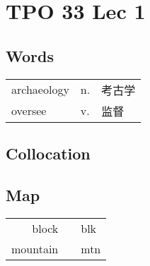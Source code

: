 \section{TPO 33 Lec 1}

\subsection{Words}

\begin{tabular}{lll}
    archaeology & n. & 考古学 \\
    oversee     & v. & 监督  \\
\end{tabular}

\subsection{Collocation}

\subsection{Map}

\begin{tabular}{rc@{\quad$\to$\quad}l}
    block    &  & blk \\
    mountain &  & mtn \\
\end{tabular}
